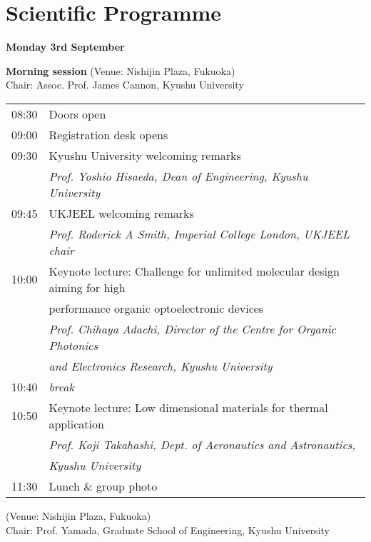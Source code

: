 \section{Scientific Programme}

\begin{center}
{\bf \large Monday 3rd September}
\end{center}
\vspace*{3ex}
{\bf Morning session} (Venue: Nishijin Plaza, Fukuoka)\\
Chair: Assoc. Prof. James Cannon, Kyushu University

\vspace{1em}
\noindent\begin{tabular}{|l|l|}
    \hline
    08:30   & Doors open \\
    09:00   & Registration desk opens \\
    09:30   & Kyushu University welcoming remarks \\
            & \emph{Prof. Yoshio Hisaeda, Dean of Engineering, Kyushu University} \\
    09:45   & UKJEEL welcoming remarks \\
            & \emph{Prof. Roderick A Smith, Imperial College London, UKJEEL chair} \\
    10:00   & Keynote lecture: Challenge for unlimited molecular design aiming for high\\
            &  \hspace{7.5em} performance organic optoelectronic devices \\
            & \emph{Prof. Chihaya Adachi, Director of the Centre for Organic Photonics}\\
            & \emph{and Electronics Research, Kyushu University} \\
    10:40   & \emph{break} \\
    10:50   & Keynote lecture: Low dimensional materials for thermal application \\
            & \emph{Prof. Koji Takahashi, Dept. of Aeronautics and Astronautics,} \\
            & \emph{Kyushu University} \\
    11:30   & Lunch \& group photo \\
    \hline
\end{tabular}

\newpage
\vspace{-3em}
 (Venue: Nishijin Plaza, Fukuoka)\\
Chair: Prof. Yamada, Graduate School of Engineering, Kyushu University

